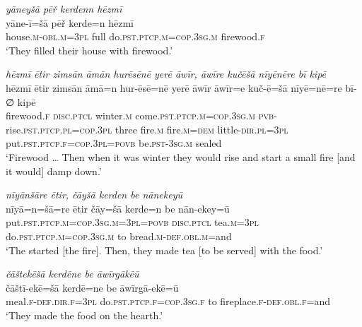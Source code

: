 \ea \label{ŽE.36}
\textit{yāneyšā pēř kerdenn hēzmī} \\ 
\gll yāne-ī=šā pēř kerde=n hēzmī \\ 
 house\textsc{.m}\textsc{-obl}\textsc{.m}\textsc{=3pl} full do\textsc{.pst}\textsc{.ptcp}\textsc{.m}\textsc{=cop}\textsc{.3sg}\textsc{.m} firewood\textsc{.f} \\ 
\glt `They filled their house with firewood.'
\z 
 
\ea \label{ŽE.37}
\textit{hēzmī ētir zimsān āmān hurēsēnē yerē āwīr, āwīre kučēšā nīyēnēre bī kipē} \\ 
\gll hēzmī ētir zimsān āmā=n hur-ēsē=nē yerē āwīr āwīr=e kuč-ē=šā nīyē=nē=re bī-∅ kipē \\ 
 firewood\textsc{.f} \textsc{disc}.\textsc{ptcl} winter\textsc{.m} come\textsc{.pst}\textsc{.ptcp}\textsc{.m}\textsc{=cop}\textsc{.3sg}\textsc{.m} \textsc{pvb-}rise\textsc{.pst}\textsc{.ptcp}\textsc{.pl}\textsc{=cop}\textsc{.3pl} three fire\textsc{.m} fire\textsc{.m}\textsc{=dem} little\textsc{-dir}\textsc{.pl}\textsc{=3pl} put\textsc{.pst}\textsc{.ptcp}\textsc{.f}\textsc{=cop}\textsc{.3pl}\textsc{=\textsc{povb}} be\textsc{.pst}\textsc{-3sg}\textsc{.m} sealed \\ 
\glt `Firewood …  Then when it was winter they would rise and start a small fire [and it would] damp down.'
\z 
 
\ea \label{ŽE.38}
\textit{nīyānšāre ētir, čāyšā kerden be nānekeyū} \\ 
\gll nīyā=n=šā=re ētir čāy=šā kerde=n be nān-ekey=ū \\ 
 put\textsc{.pst}\textsc{.ptcp}\textsc{.m}\textsc{=cop}\textsc{.3sg}\textsc{.m}\textsc{=3pl}\textsc{=\textsc{povb}} \textsc{disc}.\textsc{ptcl} tea\textsc{.m}\textsc{=3pl} do\textsc{.pst}\textsc{.ptcp}\textsc{.m}\textsc{=cop}\textsc{.3sg}\textsc{.m} to bread\textsc{.m}\textsc{-def}\textsc{.obl}\textsc{.m}=and \\ 
\glt `The started [the fire].  Then, they made tea [to be served] with the food.'
\z 
 
\ea \label{ŽE.39}
\textit{čāštekēšā kerdēne be āwīrgākēū} \\ 
\gll čāštī-ekē=šā kerdē=ne be āwīrgā-ekē=ū \\ 
 meal\textsc{.f}\textsc{-def}\textsc{.dir}\textsc{.f}\textsc{=3pl} do\textsc{.pst}\textsc{.ptcp}\textsc{.f}\textsc{=cop}\textsc{.3sg}\textsc{.f} to fireplace\textsc{.f}\textsc{-def}\textsc{.obl}\textsc{.f}=and \\ 
\glt `They made the food on the hearth.'
\z 
 
